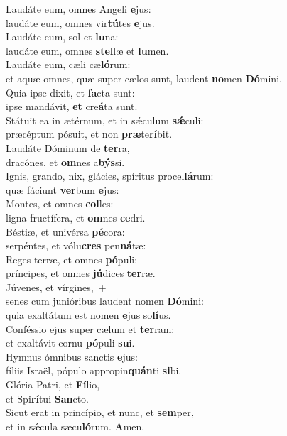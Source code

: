 \evenverse Laudáte eum, omnes Angeli \textbf{e}jus:~\*\\
\evenverse laudáte eum, omnes vir\textbf{tú}tes \textbf{e}jus.\\
\oddverse Laudáte eum, sol et \textbf{lu}na:~\*\\
\oddverse laudáte eum, omnes \textbf{stel}læ et \textbf{lu}men.\\
\evenverse Laudáte eum, cæli cæ\textbf{ló}rum:~\*\\
\evenverse et aquæ omnes, quæ super cælos sunt, laudent \textbf{no}men \textbf{Dó}mini.\\
\oddverse Quia ipse dixit, et \textbf{fa}cta sunt:~\*\\
\oddverse ipse mandávit, \textbf{et} cre\textbf{á}ta sunt.\\
\evenverse Státuit ea in ætérnum, et in sǽculum \textbf{sǽ}culi:~\*\\
\evenverse præcéptum pósuit, et non \textbf{præ}te\textbf{rí}bit.\\
\oddverse Laudáte Dóminum de \textbf{ter}ra,~\*\\
\oddverse dracónes, et \textbf{om}nes a\textbf{býs}si.\\
\evenverse Ignis, grando, nix, glácies, spíritus procel\textbf{lá}rum:~\*\\
\evenverse quæ fáciunt \textbf{ver}bum \textbf{e}jus:\\
\oddverse Montes, et omnes \textbf{col}les:~\*\\
\oddverse ligna fructífera, et \textbf{om}nes \textbf{ce}dri.\\
\evenverse Béstiæ, et univérsa \textbf{pé}cora:~\*\\
\evenverse serpéntes, et vólu\textbf{cres} pen\textbf{ná}tæ:\\
\oddverse Reges terræ, et omnes \textbf{pó}puli:~\*\\
\oddverse príncipes, et omnes \textbf{jú}dices \textbf{ter}ræ.\\
\evenverse Júvenes, et vírgines,~+\\
\evenverse  senes cum junióribus laudent nomen \textbf{Dó}mini:~\*\\
\evenverse quia exaltátum est nomen \textbf{e}jus so\textbf{lí}us.\\
\oddverse Conféssio ejus super cælum et \textbf{ter}ram:~\*\\
\oddverse et exaltávit cornu \textbf{pó}puli \textbf{su}i.\\
\evenverse Hymnus ómnibus sanctis \textbf{e}jus:~\*\\
\evenverse fíliis Israël, pópulo appropin\textbf{quán}ti \textbf{si}bi.\\
\oddverse Glória Patri, et \textbf{Fí}lio,~\*\\
\oddverse et Spi\textbf{rí}tui \textbf{San}cto.\\
\evenverse Sicut erat in princípio, et nunc, et \textbf{sem}per,~\*\\
\evenverse et in sǽcula sæcu\textbf{ló}rum. \textbf{A}men.\\
